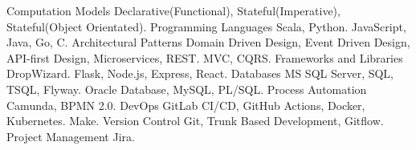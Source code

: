 \begin{cvskills}
  \cvskill
    {Computation Models} %
    { Declarative(Functional), Stateful(Imperative), Stateful(Object Orientated).}
  \cvskill
    {Programming Languages} %
    {  Scala, Python.}
  \cvskill
    {} %
    {  JavaScript, Java, Go, C.}
  \cvskill
    {Architectural Patterns} %
    {  Domain Driven Design, Event Driven Design, API-first Design, Microservices, REST.}
  \cvskill
    {} %
    {  MVC, CQRS.}
  \cvskill
    {Frameworks and Libraries} %
    {  DropWizard.}
  \cvskill
    {}
    {  Flask, Node.js, Express, React.}
  \cvskill
  {Databases} %
  {  MS SQL Server, SQL, TSQL, Flyway.}
  \cvskill
  {} %
  {  Oracle Database, MySQL, PL/SQL.}
  \cvskill
    {Process Automation}
    { Camunda, BPMN 2.0.}
  \cvskill
    {DevOps} %
    { GitLab CI/CD, GitHub Actions, Docker, Kubernetes.} %
  \cvskill
    {} %
    {  Make.}
  \cvskill
  {Version Control} %
  { Git, Trunk Based Development, Gitflow.} %
  \cvskill
  {Project Management} %
  { Jira.} %
\end{cvskills}
